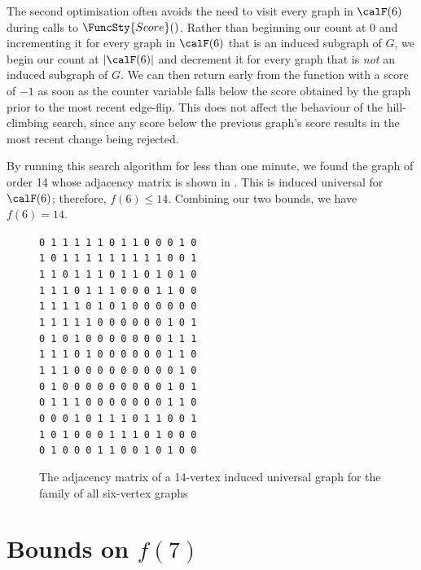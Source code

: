 The second optimisation often avoids the need to visit every graph in $\calF(6)$
during calls to $\FuncSty{Score}()$.  Rather than beginning our count at 0
and incrementing it for every graph in $\calF(6)$ that is an induced subgraph
of $G$, we begin our count at $|\calF(6)|$ and decrement it for every
graph that is \emph{not} an induced subgraph of $G$.  We can then return
early from the function with a score of $-1$ as soon as the counter variable
falls below the score obtained by the graph prior to the most recent edge-flip.
This does not affect the behaviour of the hill-climbing search, since any
score below the previous graph's score results in the most recent change being rejected.

By running this search algorithm for less than one minute, we found the graph of
order 14 whose adjacency matrix is shown in .  This is induced
universal for $\calF(6)$; therefore, $f(6) \leq 14$.  Combining our two bounds, we
have $f(6) = 14$.

\begin{figure}[htb]
\centering
\scriptsize
\verb|0 1 1 1 1 1 0 1 1 0 0 0 1 0| \\
\verb|1 0 1 1 1 1 1 1 1 1 1 0 0 1| \\
\verb|1 1 0 1 1 1 0 1 1 0 1 0 1 0| \\
\verb|1 1 1 0 1 1 1 0 0 0 1 1 0 0| \\
\verb|1 1 1 1 0 1 0 1 0 0 0 0 0 0| \\
\verb|1 1 1 1 1 0 0 0 0 0 0 1 0 1| \\
\verb|0 1 0 1 0 0 0 0 0 0 0 1 1 1| \\
\verb|1 1 1 0 1 0 0 0 0 0 0 1 1 0| \\
\verb|1 1 1 0 0 0 0 0 0 0 0 0 1 0| \\
\verb|0 1 0 0 0 0 0 0 0 0 0 1 0 1| \\
\verb|0 1 1 1 0 0 0 0 0 0 0 1 1 0| \\
\verb|0 0 0 1 0 1 1 1 0 1 1 0 0 1| \\
\verb|1 0 1 0 0 0 1 1 1 0 1 0 0 0| \\
\verb|0 1 0 0 0 1 1 0 0 1 0 1 0 0|
\caption{The adjacency matrix of a 14-vertex induced universal graph for the family of all
six-vertex graphs}
\label{fig:adjmat14}
\end{figure}

\section{Bounds on \texorpdfstring{$f(7)$}{f(7)}}\label{sec:f7}


